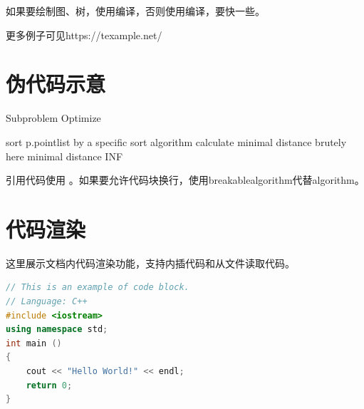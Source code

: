 \documentclass{gjm_hw}
\begin{document}
    如果要绘制图、树，使用编译，否则使用编译，要快一些。
    
    \begin{center}
    \end{center}
    
    更多例子可见https://texample.net/
    
  \section{伪代码示意}
    \begin{algorithm}[H]
    \caption{Subproblem Optimize} \label{subpro-opt}
    \begin{algorithmic}[1]
        \State sort p.pointlist by a specific sort algorithm
        \State calculate minimal distance brutely here
        \State \Return minimal distance
        \State \Return INF
    \EndIf
    \end{algorithmic}
    \end{algorithm}
    
    引用代码使用 。如果要允许代码块换行，使用breakablealgorithm代替algorithm。

  \section{代码渲染}
  
  这里展示文档内代码渲染功能，支持内插代码和从文件读取代码。
  
  \begin{lstlisting}[language=C++, title=Example Code 1]
// This is an example of code block.
// Language: C++
#include <iostream>
using namespace std;
int main ()
{
	cout << "Hello World!" << endl;
	return 0;
}
  \end{lstlisting}
	
  
\end{document}
